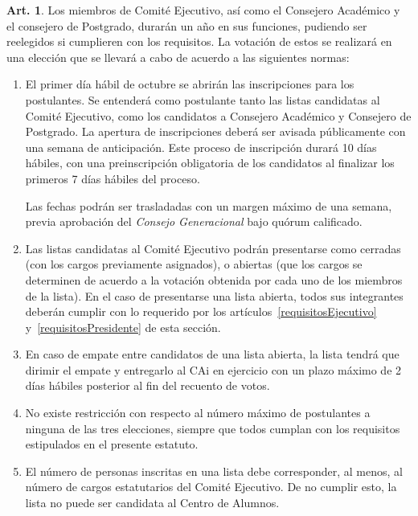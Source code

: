 \documentclass[letterpaper,11pt]{article}
\theoremstyle{definition}%
\newtheorem{art}{Art.} %
\begin{document}
\begin{art}\label{eleccionesCAi}
	Los miembros de Comité Ejecutivo, así como el Consejero Académico y el consejero de Postgrado, durarán un año en sus funciones, pudiendo ser reelegidos si cumplieren con los requisitos. La votación de estos se realizará en una elección que se llevará a cabo de acuerdo a las siguientes normas:
	\begin{enumerate}
		\item El primer día hábil de octubre se abrirán las inscripciones para los postulantes. Se entenderá como postulante tanto las listas candidatas al Comité Ejecutivo, como los candidatos a Consejero Académico y Consejero de Postgrado. La apertura de inscripciones deberá ser avisada públicamente con una semana de anticipación. Este proceso de inscripción durará 10 días hábiles, con una preinscripción obligatoria de los candidatos al finalizar los primeros 7 días hábiles del proceso.

		      Las fechas podrán ser trasladadas con un margen máximo de una semana, previa aprobación del \emph{Consejo Generacional} bajo quórum calificado.

		\item Las listas candidatas al Comité Ejecutivo podrán presentarse como cerradas (con los cargos previamente asignados), o abiertas (que los cargos se determinen de acuerdo a la votación obtenida por cada uno de los miembros de la lista). En el caso de presentarse una lista abierta, todos sus integrantes deberán cumplir con lo requerido por los artículos~\ref{requisitosEjecutivo} y~\ref{requisitosPresidente} de esta sección.

		\item En caso de empate entre candidatos de una lista abierta, la lista tendrá que dirimir el empate y entregarlo al CAi en ejercicio con un plazo máximo de 2 días hábiles posterior al fin del recuento de votos.

		\item No existe restricción con respecto al número máximo de postulantes a ninguna de las tres elecciones, siempre que todos cumplan con los requisitos estipulados en el presente estatuto.

		\item El número de personas inscritas en una lista debe corresponder, al menos, al número de cargos estatutarios del Comité Ejecutivo. De no cumplir esto, la lista no puede ser candidata al Centro de Alumnos.


\end{enumerate}
\end{art}
\end{document}
